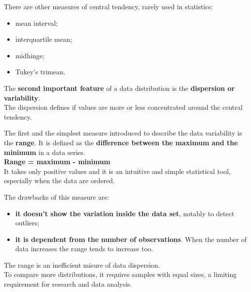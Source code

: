 
\begin{frame}
  \vspace*{1.5cm}
  There are other measures of central tendency, rarely used in statistics:\\
  \vspace{.6cm}
  \begin{itemize}
    \item mean interval;
    \item interquartile mean;
    \item midhinge;
    \item Tukey's trimean.
\end{itemize}
\end{frame}




\begin{frame}
  \vspace{.6cm}
  The \textbf{second important feature} of a data distribution is the \textbf{dispersion or variability}. \\
  \vspace{.6cm}
  The dispersion defines if values are more or less concentrated around the central tendency. \\
\end{frame}


\begin{frame}
  \vspace*{.5cm}
  The first and the simplest measure introduced to describe the data variability is the \textbf{range}. It is defined as the \textbf{difference between the maximum and the minimum} in a data series.\\
  \vspace{.75cm}
  \textbf{Range = maximum - minimum}\\
  \vspace{.75cm}
  It takes only positive values and it is an intuitive and simple statistical tool, especially when the data are ordered.\\
\end{frame}

\begin{frame}
  The drawbacks of this measure are:\\
  \begin{itemize}
    \item \textbf{it doesn't show the variation inside the data set}, notably to detect outliers;
    \item \textbf{it is dependent from the number of observations}. When the number of data increases the range tends to increase too.\\
  \end{itemize}
 \vspace*{.3cm}
  The range is an inefficient misure of data dispersion.\\
 \vspace*{.3cm}
  To compare more distributions, it requires samples with equal sizes, a limiting requirement for research and data analysis.
\end{frame}

